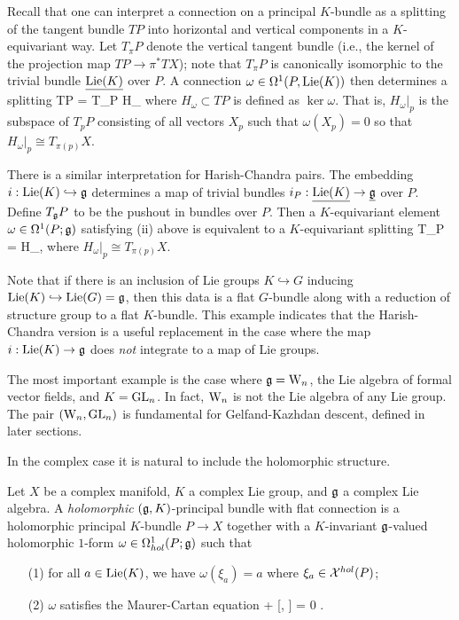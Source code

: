Recall that one can interpret a connection on a principal $K$-bundle as a splitting of the tangent bundle $TP$ into horizontal and vertical components in a $K$-equivariant way. 
Let $T_\pi P$ denote the vertical tangent bundle (i.e., the kernel of the projection map $TP \to \pi^* TX$);
note that $T_\pi P$ is canonically isomorphic to the trivial bundle $\underline{{\rm Lie}(K)}$ over $P$.
A connection $\omega \in \Omega^1(P,{\rm Lie}(K))$ then determines a splitting
\ben
TP = T_\pi P \oplus H_\omega
\een
where $H_\omega \subset TP$ is defined as $\ker \omega$. That is, $H_\omega|_{p}$ is the subspace of $T_p P$ consisting of all vectors $X_p$ such that $\omega(X_p) = 0$ so that $H_{\omega}|_p \cong T_{\pi(p)}X$.   

There is a similar interpretation for Harish-Chandra pairs.
The embedding $i: {\rm Lie}(K) \hookrightarrow \mathfrak g$ determines a map of trivial bundles $i_P: \underline{{\rm Lie}(K)} \to \underline{\mathfrak g}$ over $P$. Define $T_\mathfrak g P$ to be the pushout
\ben
{}
\een
in bundles over $P$. Then a $K$-equivariant element $\omega \in \Omega^1(P; \mathfrak g)$ satisfying (ii) above is equivalent to a $K$-equivariant splitting
\ben
T_\fg P = \ul{\fg} \oplus H_{\omega}, 
\een
where $H_{\omega}|_p \cong T_{\pi(p)} X$. 

Note that if there is an inclusion of Lie groups $K \hookrightarrow G$ inducing ${\rm Lie}(K) \hookrightarrow {\rm Lie}(G) = \mathfrak g$, 
then this data is a flat $G$-bundle along with a reduction of structure group to a flat $K$-bundle.
This example indicates that the Harish-Chandra version is a useful replacement in the case where the map $i:{\rm Lie}(K) \to \mathfrak g$ does \emph{not} integrate to a map of Lie groups. 

\begin{ex} The most
important example is the case where $\mathfrak g = {{\rm W}_n}$, the Lie algebra
of formal vector fields, and $K = {\rm GL}_n$. In fact, ${{\rm W}_n}$ is not the
Lie algebra of any Lie group. The pair $({{\rm W}_n},{\rm GL}_n)$ is
fundamental for Gelfand-Kazhdan descent, defined in later sections.
\end{ex}

In the complex case it is natural to include the holomorphic structure. 

\begin{dfn}\label{holgk} 
Let $X$ be a complex manifold, $K$ a complex Lie group, and $\mathfrak g$ a complex Lie algebra. 
A {\em holomorphic} $(\mathfrak g,K)$-principal bundle with flat connection is a holomorphic principal
$K$-bundle $P \to X$ together with a $K$-invariant $\mathfrak g$-valued
holomorphic $1$-form $\omega \in \Omega^1_{hol}(P;\mathfrak g)$ such that 
\begin{itemize}
\item[(1)] for all $a \in {\rm Lie}(K)$, we have $\omega(\xi_a) = a$ where
  $\xi_a \in \mathcal X^{hol}(P)$; 
\item[(2)] $\omega$ satisfies the Maurer-Cartan equation
\ben
\partial \omega +  [\omega, \omega] = 0 .
\een 
\end{itemize}
\end{dfn}

